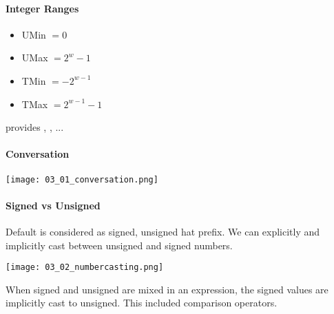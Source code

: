 \paragraph{Integer Ranges}

\begin{itemize}
    \item UMin $= 0$
    \item UMax $= 2^w -1$
    \item TMin $=-2^{w - 1}$
    \item TMax $=2^{w-1} - 1$
\end{itemize}

 provides , , ...

\paragraph{Conversation}

\texttt{[image: 03\_01\_conversation.png]}

\paragraph{Signed vs Unsigned}
Default is considered as signed, unsigned hat  prefix. We can explicitly and implicitly cast between unsigned and signed numbers.

\texttt{[image: 03\_02\_numbercasting.png]}

When signed and unsigned are mixed in an expression, the signed values are implicitly cast to unsigned. This included comparison operators.

